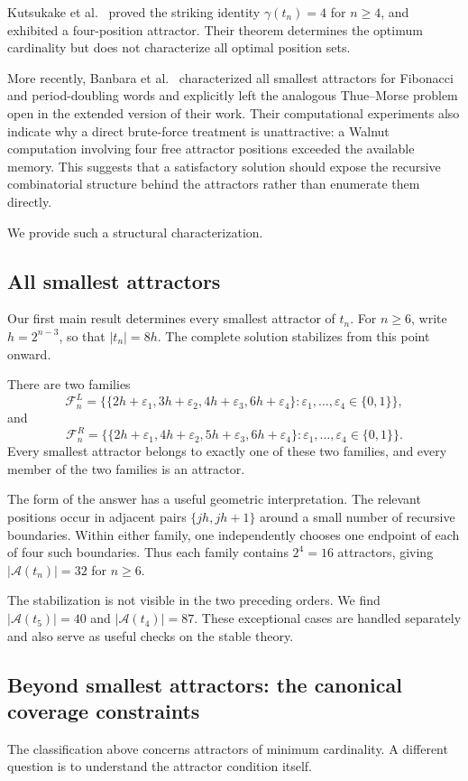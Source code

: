 \documentclass[10pt,a4paper]{article}
\theoremstyle{definition}\newtheorem{definition}[theorem]{Definition}
\theoremstyle{remark}\newtheorem{remark}[theorem]{Remark}
\newcommand{\Acal}{\mathcal{A}}
\newcommand{\FL}{\mathcal{F}^{L}}
\newcommand{\FR}{\mathcal{F}^{R}}
\begin{document}
Kutsukake et al.~\cite{Kutsukake2020} proved the striking identity
$
\gamma(t_n)=4$
for $n\geq4$,
and exhibited a four-position attractor. Their theorem determines the optimum cardinality but does not characterize all optimal position sets.

More recently, Banbara et al.~\cite{Banbara2026} characterized all smallest attractors for Fibonacci and period-doubling words and explicitly left the analogous Thue--Morse problem open in the extended version of their work. Their computational experiments also indicate why a direct brute-force treatment is unattractive: a Walnut computation involving four free attractor positions exceeded the available memory. This suggests that a satisfactory solution should expose the recursive combinatorial structure behind the attractors rather than enumerate them directly.

We provide such a structural characterization.

\subsection{All smallest attractors}
Our first main result determines every smallest attractor of $t_n$. For $n\geq6$, write $h=2^{n-3}$, so that $|t_n|=8h$. The complete solution stabilizes from this point onward.

There are two families
\[
\FL_n=\bigl\{\{2h+\varepsilon_1,3h+\varepsilon_2,4h+\varepsilon_3,6h+\varepsilon_4\}:\varepsilon_1,\ldots,\varepsilon_4\in\{0,1\}\bigr\},
\]
and
\[
\FR_n=\bigl\{\{2h+\varepsilon_1,4h+\varepsilon_2,5h+\varepsilon_3,6h+\varepsilon_4\}:\varepsilon_1,\ldots,\varepsilon_4\in\{0,1\}\bigr\}.
\]
Every smallest attractor belongs to exactly one of these two families, and every member of the two families is an attractor.

The form of the answer has a useful geometric interpretation. The relevant positions occur in adjacent pairs $\{jh,jh+1\}$ around a small number of recursive boundaries. Within either family, one independently chooses one endpoint of each of four such boundaries. Thus each family contains $2^4=16$ attractors, giving $|\Acal(t_n)|=32$ for $n\geq6$.

The stabilization is not visible in the two preceding orders. We find $|\Acal(t_5)|=40$ and $|\Acal(t_4)|=87$. These exceptional cases are handled separately and also serve as useful checks on the stable theory.

\subsection{Beyond smallest attractors: the canonical coverage constraints}
The classification above concerns attractors of minimum cardinality. A different question is to understand the attractor condition itself.
\end{document}
